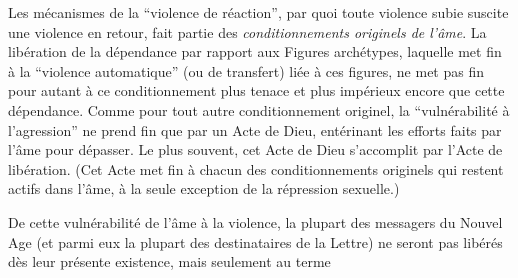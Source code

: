 Les mécanismes de la ``violence de réaction'', par quoi toute violence subie suscite une violence en retour, fait partie des \textit{conditionnements originels de l’âme}. La libération de la dépendance par rapport aux Figures archétypes, laquelle met fin à la ``violence automatique'' (ou de transfert) liée à ces figures, ne met pas fin pour autant à ce conditionnement plus tenace et plus impérieux encore que cette dépendance. Comme pour tout autre conditionnement originel, la ``vulnérabilité à l’agression'' ne prend fin que par un Acte de Dieu, entérinant les efforts faits par l’âme pour  dépasser. Le plus souvent, cet Acte de Dieu s’accomplit par l’Acte de libération. (Cet Acte met fin à chacun des conditionnements originels qui restent actifs dans l’âme, à la seule exception de la répression sexuelle.)

De cette vulnérabilité de l’âme à la violence, la plupart des messagers du Nouvel Age (et parmi eux la plupart des destinataires de la Lettre) ne seront pas libérés dès leur présente existence, mais seulement au terme

